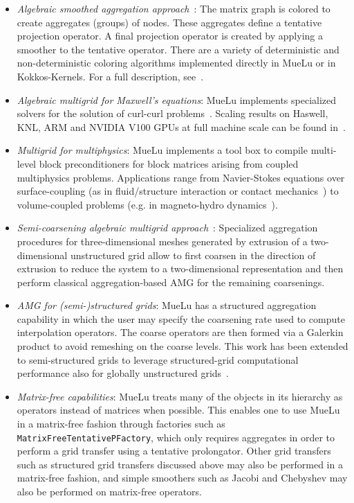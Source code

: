 \begin{itemize}
\item \emph{Algebraic smoothed aggregation approach}~\cite{Vanek1996a}:
The matrix graph is colored to create aggregates (groups) of nodes.
These aggregates define a tentative projection operator.
A final projection operator is created by applying a smoother to the tentative operator.
There are a variety of deterministic and non-deterministic coloring algorithms implemented directly
in MueLu or in Kokkos-Kernels.  For a full description, see~\cite{BergerVergiat2023a}.

\item \emph{Algebraic multigrid for Maxwell’s equations}:
  MueLu implements specialized solvers for the solution of curl-curl problems~\cite{BochevHuEtAl2008_AlgebraicMultigridApproachBased}.
  Scaling results on Haswell, KNL, ARM and NVIDIA V100 GPUs at full machine scale can be found in~\cite{BettencourtBrownEtAl2021_EmpirePic}.

\item \emph{Multigrid for multiphysics}:
MueLu implements a tool box to compile multi-level block preconditioners for block matrices arising from coupled multiphysics problems.
Applications range from Navier-Stokes equations
over surface-coupling (as in fluid/structure interaction or contact mechanics~\cite{Wiesner2021a})
to volume-coupled problems (e.g. in magneto-hydro dynamics~\cite{Ohm2022a}).

\item \emph{Semi-coarsening algebraic multigrid approach}~\cite{Tuminaro2016a}:
Specialized aggregation procedures for three-dimensional meshes generated by extrusion of a two-dimensional unstructured grid
allow to first coarsen in the direction of extrusion to reduce the system to a two-dimensional representation and then perform classical aggregation-based AMG
for the remaining coarsenings.

\item \emph{AMG for (semi-)structured grids}:
MueLu has a structured aggregation capability in which the user may specify the coarsening rate used to compute interpolation operators.
The coarse operators are then formed via a Galerkin product to avoid remeshing on the coarse levels.
This work has been extended to semi-structured grids to leverage structured-grid computational performance also for globally unstructured grids~\cite{Mayr2022a}.

\item \emph{Matrix-free capabilities}:
MueLu treats many of the objects in its hierarchy as operators instead of matrices when possible.
This enables one to use MueLu in a matrix-free fashion through factories such as \texttt{MatrixFreeTentativePFactory},
which only requires aggregates in order to perform a grid transfer using a tentative prolongator.
Other grid transfers such as structured grid transfers discussed above may also be performed in a matrix-free fashion,
and simple smoothers such as Jacobi and Chebyshev may also be performed on matrix-free operators.

\end{itemize}


